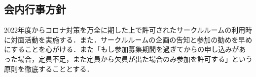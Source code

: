 \subsection*{会内行事方針}

2022年度からコロナ対策を万全に期した上で許可されたサークルルームの利用時に対面活動を実施する．また．サークルルームの企画の告知と参加の勧めを早めにすることを心がける．また「もし参加募集期間を過ぎてからの申し込みがあった場合，定員不足，また定員から欠員が出た場合のみ参加を許可する」という原則を徹底することとする．
